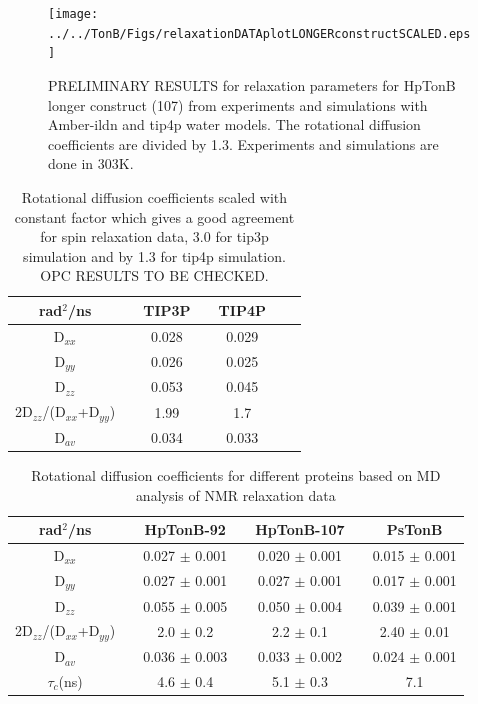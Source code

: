 \documentclass[pre,aps,floatfix,authordate1-4,twocolumn]{revtex4-1}
\begin{document}
\begin{figure}[!h]
  \texttt{[image: ../../TonB/Figs/relaxationDATAplotLONGERconstructSCALED.eps]}%
  \caption{PRELIMINARY RESULTS for relaxation parameters for HpTonB longer construct (107) from
    experiments and simulations with Amber-ildn and tip4p water models.
    The rotational diffusion coefficients are divided by 1.3.
    Experiments and simulations are done in 303K.
    \label{relaxationDATAplotSCALEDlongerCONSTRUCT}}%
\end{figure}


\begin{table}[htb]
\centering
\caption{Rotational diffusion coefficients scaled with constant factor which
  gives a good agreement for spin relaxation data,  3.0 for tip3p simulation
    and by 1.3 for tip4p simulation.
  OPC RESULTS TO BE CHECKED.
}\label{ROTdiffCOEFFS}
\begin{tabular}{c c c c c c c }
  rad$^2$/ns   &    &  TIP3P  &   &   TIP4P \\%
  \hline
  D$_{xx}$    &   &   0.028   &   &   0.029 \\%
  D$_{yy}$   &    &  0.026   &    &   0.025 \\%
  D$_{zz}$   &    &  0.053    &    &   0.045 \\%
  2D$_{zz}$/(D$_{xx}$+D$_{yy}$) &  &   1.99    &  & 1.7 \\%
  D$_{av}$  &    &   0.034    &    &   0.033 \\%
\end{tabular}
\end{table} 


\begin{table}[htb]
\centering
\caption{Rotational diffusion coefficients for different proteins based on MD analysis of NMR relaxation data
}\label{ROTdiffCOEFFS}
\begin{tabular}{c c c c c c c}
  rad$^2$/ns   &    &  HpTonB-92  &   & HpTonB-107 & & PsTonB \\
  \hline
  D$_{xx}$    &   &   0.027 $\pm$ 0.001  &   &  0.020 $\pm$ 0.001 & & 0.015  $\pm$ 0.001\\
  D$_{yy}$   &    &  0.027  $\pm$ 0.001  &    & 0.027 $\pm$ 0.001 & & 0.017  $\pm$ 0.001\\
  D$_{zz}$   &    &  0.055   $\pm$ 0.005  &    &  0.050  $\pm$ 0.004 & & 0.039  $\pm$ 0.001\\
  2D$_{zz}$/(D$_{xx}$+D$_{yy}$) &  &   2.0  $\pm$ 0.2    &  & 2.2   $\pm$ 0.1 & & 2.40 $\pm$ 0.01 \\
  D$_{av}$  &    &   0.036  $\pm$ 0.003    &    &  0.033  $\pm$ 0.002 & & 0.024  $\pm$ 0.001\\
  $\tau_{c}$(ns)  &    &  4.6   $\pm$ 0.4    &    &  5.1  $\pm$ 0.3 & & 7.1 \\
\end{tabular}
\end{table} 
\end{document}

